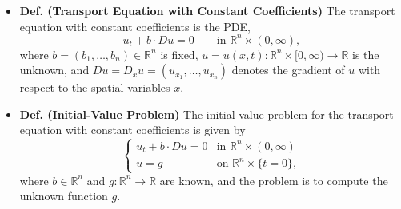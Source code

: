 \documentclass{article}
\begin{document}
	\begin{itemize}
		\item \textbf{Def. (Transport Equation with Constant Coefficients)} The transport equation with constant coefficients is the PDE, 
		\begin{equation*}
			u_{t} + b \cdot Du = 0 \qquad \text{in $\mathbb{R}^{n} \times (0, \infty)$}, 
		\end{equation*}
		where $b = (b_{1}, \ldots, b_{n}) \in \mathbb{R}^{n}$ is fixed, $u = u(x,t): \mathbb{R}^{n} \times [0,\infty) \to \mathbb{R}$ is the unknown, and $Du = D_{x}u = (u_{x_{1}}, \ldots, u_{x_{n}})$ denotes the gradient of $u$ with respect to the spatial variables $x$. 
		
		\item \textbf{Def. (Initial-Value Problem)} The initial-value problem for the transport equation with constant coefficients is given by 
		\begin{equation*}
			\begin{cases}
				u_{t} + b \cdot Du = 0 & \text{in $\mathbb{R}^n \times (0,\infty)$} \\
				u = g & \text{on $\mathbb{R}^n \times \{t = 0\}$}, 
			\end{cases}
		\end{equation*}
		where $b \in \mathbb{R}^n$ and $g: \mathbb{R}^n \to \mathbb{R}$ are known, and the problem is to compute the unknown function $g$. 
		

\end{itemize}
\end{document}
